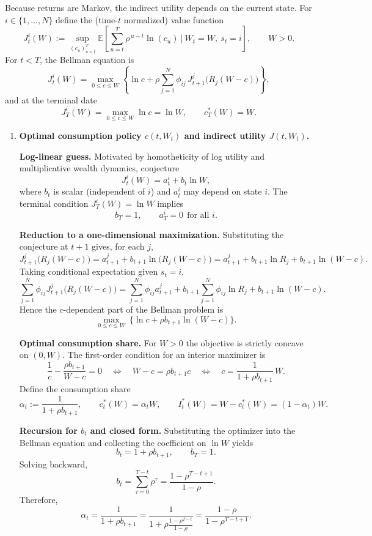\documentclass{article}
\begin{document}
Because returns are Markov, the indirect utility depends on the current state. For $i\in\{1,\dots,N\}$ define the (time-$t$ normalized) value function
\[
J_t^i(W)
:=
\sup_{(c_u)_{u=t}^T}
\mathbb{E}\!\left[
\sum_{u=t}^T \rho^{\,u-t}\ln(c_u)
\ \Big|\ W_t=W,\ s_t=i
\right],
\qquad W>0.
\]
For $t<T$, the Bellman equation is
\[
J_t^i(W)
=
\max_{0\le c\le W}
\left\{
\ln c
+
\rho\sum_{j=1}^N \phi_{ij}\,
J_{t+1}^j\!\big(R_j(W-c)\big)
\right\},
\]
and at the terminal date
\[
J_T^i(W)=\max_{0\le c\le W}\ln c=\ln W,
\qquad c_T^*(W)=W.
\]


\newpage
\begin{enumerate}
\item[(a)] \textbf{Optimal consumption policy $c(t,W_t)$ and indirect utility $J(t,W_t)$.}

\medskip
\noindent\textbf{Log-linear guess.}
Motivated by homotheticity of log utility and multiplicative wealth dynamics, conjecture
\[
J_t^i(W)=a_t^i+b_t\ln W,
\]
where $b_t$ is scalar (independent of $i$) and $a_t^i$ may depend on state $i$.
The terminal condition $J_T^i(W)=\ln W$ implies
\[
b_T=1,
\qquad
a_T^i=0 \ \ \text{for all } i.
\]

\medskip
\noindent\textbf{Reduction to a one-dimensional maximization.}
Substituting the conjecture at $t+1$ gives, for each $j$,
\[
J_{t+1}^j\!\big(R_j(W-c)\big)
=
a_{t+1}^j+b_{t+1}\ln\!\big(R_j(W-c)\big)
=
a_{t+1}^j+b_{t+1}\ln R_j+b_{t+1}\ln(W-c).
\]
Taking conditional expectation given $s_t=i$,
\[
\sum_{j=1}^N \phi_{ij}J_{t+1}^j\!\big(R_j(W-c)\big)
=
\sum_{j=1}^N\phi_{ij}a_{t+1}^j
+
b_{t+1}\sum_{j=1}^N\phi_{ij}\ln R_j
+
b_{t+1}\ln(W-c).
\]
Hence the $c$-dependent part of the Bellman problem is
\[
\max_{0\le c\le W}\ \bigl\{\ln c+\rho b_{t+1}\ln(W-c)\bigr\}.
\]

\medskip
\noindent\textbf{Optimal consumption share.}
For $W>0$ the objective is strictly concave on $(0,W)$.
The first-order condition for an interior maximizer is
\[
\frac{1}{c}-\frac{\rho b_{t+1}}{W-c}=0
\quad\Longleftrightarrow\quad
W-c=\rho b_{t+1}c
\quad\Longleftrightarrow\quad
c=\frac{1}{1+\rho b_{t+1}}\,W.
\]
Define the consumption share
\[
\alpha_t:=\frac{1}{1+\rho b_{t+1}},
\qquad
c_t^*(W)=\alpha_t W,
\qquad
I_t^*(W)=W-c_t^*(W)=(1-\alpha_t)W.
\]

\medskip
\noindent\textbf{Recursion for $b_t$ and closed form.}
Substituting the optimizer into the Bellman equation and collecting the coefficient on $\ln W$ yields
\[
b_t=1+\rho b_{t+1},
\qquad b_T=1.
\]
Solving backward,
\[
b_t=\sum_{\tau=0}^{T-t}\rho^\tau=\frac{1-\rho^{T-t+1}}{1-\rho}.
\]
Therefore,
\[
\alpha_t
=
\frac{1}{1+\rho b_{t+1}}
=
\frac{1}{1+\rho\frac{1-\rho^{T-t}}{1-\rho}}
=
\frac{1-\rho}{1-\rho^{T-t+1}}.
\]


\end{enumerate}
\end{document}
